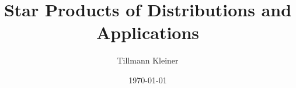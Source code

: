 \title{Star Products of Distributions and Applications}
\author{Tillmann Kleiner}
\date{\today}

\maketitle

\tableofcontents